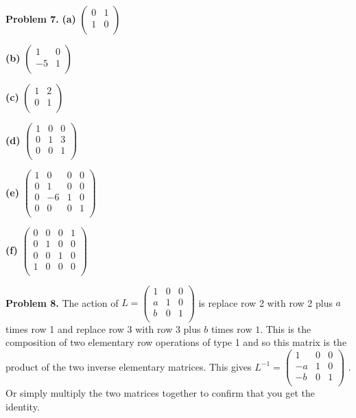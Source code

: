 \documentclass[oneside,12pt]{amsart}
\begin{document}
\bigskip

\textbf{Problem 7.}
\textbf{(a)}
$
\begin{pmatrix}
0 & 1 \\
1 & 0 \\
\end{pmatrix}
$

\bigskip

\textbf{(b)}
$
\begin{pmatrix}
1 & 0 \\
-5 & 1 \\
\end{pmatrix}
$

\bigskip

\textbf{(c)}
$
\begin{pmatrix}
1 & 2 \\
0 & 1 \\
\end{pmatrix}
$

\bigskip

\textbf{(d)}
$
\begin{pmatrix}
1 & 0  & 0 \\
0 & 1  & 3 \\
0 & 0  & 1\\
\end{pmatrix}
$

\bigskip

\textbf{(e)}
$
\begin{pmatrix}
1 & 0  & 0 & 0\\
0 & 1  & 0 & 0\\
0 & -6  & 1 & 0\\
0 & 0  & 0 & 1\\
\end{pmatrix}
$

\bigskip

\textbf{(f)}
$
\begin{pmatrix}
0 & 0  & 0 & 1\\
0 & 1  & 0 & 0\\
0 & 0  & 1 & 0\\
1 & 0  & 0 & 0\\
\end{pmatrix}
$

\bigskip

\textbf{Problem 8.} The action of
$
L=
\begin{pmatrix}
1 & 0  & 0 \\
a & 1  & 0 \\
b & 0  & 1\\
\end{pmatrix}
$
is replace row 2 with row 2 plus $a$ times row 1 and replace row 3 with
row 3 plus $b$ times row $1$. This is the composition of two elementary
row operations of type 1 and so this matrix is the product of the two
inverse elementary matrices. This gives
$
L^{-1}=
\begin{pmatrix}
1 & 0  & 0 \\
-a & 1  & 0 \\
-b & 0  & 1\\
\end{pmatrix}
$
.
Or simply multiply the two matrices together to confirm that you get
the identity.
\end{document}
